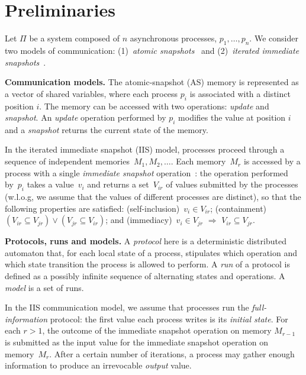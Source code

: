 \documentclass[a4paper]{article}
\newcommand{\myparagraph}[1]{\vspace{6pt}\noindent \textbf{#1}}
\def\Nat{\ensuremath{\mathbb{N}}}
\begin{document}
\section{Preliminaries}
\label{sec:model}

Let $\Pi$ be a system composed of $n$ asynchronous processes, 
$p_1,\ldots,p_n$. We consider two models of communication: 
(1)~\emph{atomic snapshots}~\cite{AADGMS93} and 
(2)~\emph{iterated immediate snapshots}~\cite{BG97,HS99}.

\myparagraph{Communication models.}
%
The atomic-snapshot (AS) memory is represented as a vector of 
shared variables, where each process $p_i$ is associated with a distinct 
position $i$. The memory can be accessed with two operations: \emph{update} and 
\emph{snapshot}. An \emph{update} operation performed by $p_i$ 
modifies the value at position $i$ 
and a \emph{snapshot} returns the current state of the memory.

%
In the iterated immediate snapshot (IIS) model,
processes proceed through a sequence of independent 
memories~$M_1, M_2,\ldots$. Each memory~$M_r$ is accessed 
by a process with a single \emph{immediate snapshot} 
operation~\cite{BG93a}: the operation performed by~$p_i$ takes a
value~$v_i$ and returns a set~$V_{ir}$ of values submitted by 
the processes (w.l.o.g, we assume that the values of 
different processes are distinct), so that the following 
properties are satisfied: (self-inclusion)~$v_i \in V_{ir}$; 
(containment)~$(V_{ir}\subseteq V_{jr}) \vee (V_{jr}\subseteq V_{ir})$; and 
(immediacy)~$v_i \in V_{jr}$ $\Rightarrow$ $V_{ir}\subseteq V_{jr}$. 


\myparagraph{Protocols, runs and models.}
%
A \emph{protocol} here is a deterministic  distributed automaton that, for each 
local state of a process, stipulates which operation and which 
state transition the process is allowed to perform. 
A \emph{run} of a protocol is defined as a possibly infinite 
sequence of alternating states and operations.
A \emph{model} is a set of runs.
%

In the IIS communication model, we assume that processes run the 
\emph{full-information} protocol: the first value each process 
writes is its \emph{initial state}. For each $r>1$, the outcome of 
the immediate snapshot operation on memory $M_{r-1}$ is 
submitted as the input value for the immediate snapshot 
operation on memory~$M_r$. After a certain number of iterations,
a process may gather enough information 
to produce an irrevocable \emph{output} value.
\end{document}
